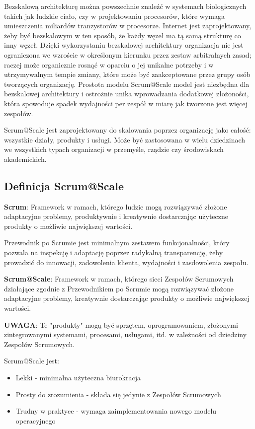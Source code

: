 \documentclass[12pt,a4paper,parskip=full]{scrartcl}
\begin{document}
Bezskalową architekturę można powszechnie znaleźć w systemach biologicznych takich jak ludzkie ciało, czy w projektowaniu procesorów, które wymaga umieszczenia miliardów tranzystorów w procesorze. Internet jest zaprojektowany, żeby być bezskalowym w ten sposób, że każdy węzeł ma tą samą strukturę co inny węzeł. Dzięki wykorzystaniu bezskalowej architektury organizacja nie jest ograniczona we wzroście w określonym kierunku przez zestaw arbitralnych zasad; raczej może organicznie rosnąć w oparciu o jej unikalne potrzeby i w utrzymywalnym tempie zmiany, które może być zaakceptowane przez grupy osób tworzących organizację. Prostota modelu Scrum@Scale model jest niezbędna dla  bezskalowej architektury i ostrożnie unika wprowadzania dodatkowej złożoności, która spowoduje spadek wydajności per zespół w miarę jak tworzone jest więcej zespołów.

Scrum@Scale jest zaprojektowany do skalowania poprzez organizację jako całość: wszystkie działy, produkty i usługi. Może być zastosowana w wielu dziedzinach we wszystkich typach organizacji w przemyśle, rządzie czy środowiskach akademickich.

\subsection{Definicja Scrum@Scale}

\textbf{Scrum}: Framework w ramach, którego ludzie mogą rozwiązywać złożone adaptacyjne problemy, produktywnie i kreatywnie dostarczając użyteczne produkty o możliwie największej wartości.

Przewodnik po Scrumie jest minimalnym zestawem funkcjonalności, który pozwala na inspekcję i adaptację poprzez radykalną transparencję, żeby prowadzić do innowacji, zadowolenia klienta, wydajności i zasdowolenia zespołu.

\textbf{Scrum@Scale}: Framework w ramach, którego sieci Zespołów Scrumowych działające zgodnie z Przewodnikiem po Scrumie mogą rozwiązywać złożone adaptacyjne problemy, kreatywnie dostarczając  produkty o możliwie największej wartości.

\textbf{UWAGA}: Te "produkty" mogą być sprzętem, oprogramowaniem, złożonymi zintegrowanymi systemami, procesami, usługami, itd. w zależności od dziedziny Zespołów Scrumowych.

Scrum@Scale jest:
\begin{itemize}
	\item Lekki - minimalna użyteczna biurokracja
	\item Prosty do zrozumienia - składa się jedynie z Zespołów Scrumowych
	\item Trudny w praktyce - wymaga zaimplementowania nowego modelu operacyjnego
\end{itemize}
\end{document}
